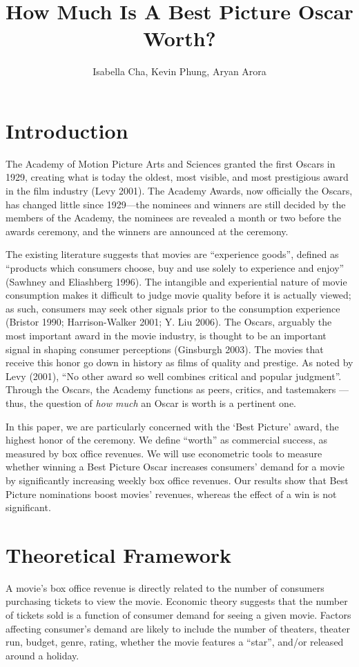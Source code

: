 \documentclass[11pt]{article} %
\begin{document}
\title{How Much Is A Best Picture Oscar Worth?}
\author{Isabella Cha, Kevin Phung, Aryan Arora}
\maketitle

\section{Introduction}
The Academy of Motion Picture Arts and Sciences granted the first Oscars in 1929, creating what is today the oldest, most visible, and most prestigious award in the film industry (Levy 2001). The Academy Awards, now officially the Oscars, has changed little since 1929---the nominees and winners are still decided by the members of the Academy, the nominees are revealed a month or two before the awards ceremony, and the winners are announced at the ceremony.

The existing literature suggests that movies are “experience goods”, defined as “products which consumers choose, buy and use solely to experience and enjoy” (Sawhney and Eliashberg 1996). The intangible and experiential nature of movie consumption makes it difficult to judge movie quality before it is actually viewed; as such, consumers may seek other signals prior to the consumption experience (Bristor 1990; Harrison-Walker 2001; Y. Liu 2006). The Oscars, arguably the most important award in the movie industry, is thought to be an important signal in shaping consumer perceptions (Ginsburgh 2003). The movies that receive this honor go down in history as films of quality and prestige. As noted by Levy (2001), “No other award so well combines critical and popular judgment”. Through the Oscars, the Academy functions as peers, critics, and tastemakers — thus, the question of \textit{how much} an Oscar is worth is a pertinent one. 

In this paper, we are particularly concerned with the ‘Best Picture’ award, the highest honor of the ceremony. We define “worth” as commercial success, as measured by box office revenues. We will use econometric tools to measure whether winning a Best Picture Oscar increases consumers’ demand for a movie by significantly increasing weekly box office revenues. Our results show that Best Picture nominations boost movies’ revenues, whereas the effect of a win is not significant.  



\section{Theoretical Framework}
A movie’s box office revenue is directly related to the number of consumers purchasing tickets to view the movie. Economic theory suggests that the number of tickets sold is a function of consumer demand for seeing a given movie. Factors affecting consumer’s demand are likely to include the number of theaters, theater run, budget, genre, rating, whether the movie features a “star”, and/or released around a holiday. 
\end{document}
